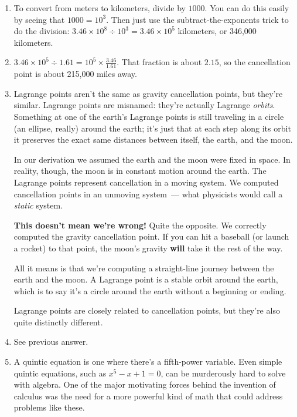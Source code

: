 \documentclass[12pt,letterpaper]{article}
\begin{document}
  \begin{enumerate}
  \item
    To convert from meters to kilometers, divide by $1000$.  You can
    do this easily by seeing that $1000 = 10^3$.  Then just use the
    subtract-the-exponents trick to do the division: $3.46 \times 10^8
    \div 10^3 = 3.46 \times 10^5$ kilometers, or 346,000 kilometers.
  \item
    $3.46 \times 10^5 \div 1.61 = 10^5 \times \frac{3.46}{1.61}$.
    That fraction is about $2.15$, so the cancellation point is about
    215,000 miles away.
  \item
    Lagrange points aren't the same as gravity cancellation points,
    but they're similar.  Lagrange points are misnamed: they're
    actually Lagrange \textit{orbits}.  Something at one of the
    earth's Lagrange points is still traveling in a
    circle (an ellipse, really) around the earth; it's just that at
    each step along its orbit it preserves the exact same distances
    between itself, the earth, and the moon.

    In our derivation we assumed the earth and the moon were fixed in
    space.  In reality, though, the moon is in constant motion around
    the earth.  The Lagrange points represent cancellation in a moving
    system.  We computed cancellation points in an unmoving
    \mbox{system ---} what physicists would call a \textit{static}
    system.

    \textbf{This doesn't mean we're wrong!}  Quite the opposite.  We
    correctly computed the gravity cancellation point.  If you can hit
    a baseball (or launch a rocket) to that point, the moon's gravity
    \textbf{will} take it the rest of the way.

    All it means is that we're computing a straight-line journey
    between the earth and the moon.  A Lagrange point is a stable
    orbit around the earth, which is to say it's a circle around the
    earth without a beginning or ending.

    Lagrange points are closely related to cancellation points, but
    they're also quite distinctly different.
  \item
    See previous answer.
  \item
    A quintic equation is one where there's a fifth-power variable.
    Even simple quintic equations, such as $x^5 - x + 1 = 0$, can be
    murderously hard to solve with algebra.  One of the major
    motivating forces behind the invention of calculus was the need
    for a more powerful kind of math that could address problems like
    these.
  \end{enumerate}
\end{document}
